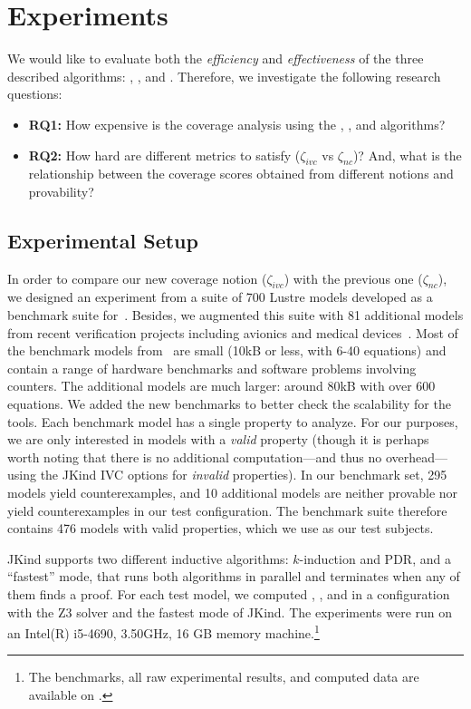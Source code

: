 \section{Experiments}
\label{sec:experiments}

We would like to evaluate both the {\em efficiency} and {\em
  effectiveness} of the three described algorithms: \ucbfalg, \ucalg, and \mustalg. Therefore, we investigate the following research questions:
\begin{itemize}
    \item \textbf{RQ1:} How expensive is the coverage analysis using the \ucalg, \mustalg, and \ucbfalg algorithms?
    \item \textbf{RQ2:} How hard are different metrics to satisfy ($\zeta_{ivc}$ vs $\zeta_{nc}$)?  And, what is the relationship between the coverage scores obtained from different notions and provability?
\end{itemize}

\subsection{Experimental Setup}

In order to compare our new coverage notion ($\zeta_{ivc}$) with the previous one ($\zeta_{nc}$), we designed an experiment from a suite of 700 Lustre models developed
as a benchmark suite for~\cite{Hagen08:FMCAD}. Besides, we augmented this suite
with 81 additional models from recent verification projects including
avionics and medical devices~\cite{QFCS15:backes,hilt2013}. Most of
the benchmark models from~\cite{Hagen08:FMCAD} are small (10kB or less,
with 6-40 equations) and contain a range of hardware benchmarks and
software problems involving counters. The additional models are much
larger: around 80kB with over 600 equations. We added the new
benchmarks to better check the scalability for the tools. Each benchmark model has a single property to analyze.  For our purposes, we are only interested in models with a {\em valid} property (though it is perhaps worth noting that there is no additional computation---and thus no overhead---using the JKind IVC options for {\em invalid} properties).  In our benchmark set, 295 models yield counterexamples, and 10 additional models are neither provable nor yield counterexamples in our test configuration.  The benchmark suite therefore contains 476 models with valid properties, which we use as our test subjects.

JKind supports two different inductive algorithms: $k$-induction and PDR, and a ``fastest'' mode, that runs both algorithms in parallel and terminates when any of them finds a proof. For each test model, we computed \ucalg, \ucbfalg, and \mustalg in a configuration with
the Z3 solver and the fastest mode of JKind. The experiments
were run on an  Intel(R) i5-4690, 3.50GHz,
16 GB memory machine.\footnote{The benchmarks, all raw experimental results,
  and computed data are available on \cite{expr}.}

